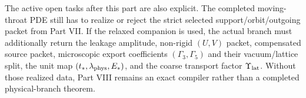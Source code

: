 The active open tasks after this part are also explicit.  The completed moving-throat PDE still has to realize or reject the strict selected support/orbit/outgoing packet from Part VII.  If the relaxed companion is used, the actual branch must additionally return the leakage amplitude, non-rigid \((U,V)\) packet, compensated source packet, microscopic export coefficients \((\Gamma_3,\Gamma_5)\) and their vacuum/lattice split, the unit map \((t_*,\lambda_{\rm phys},E_*)\), and the coarse transport factor \(\Upsilon_{\rm lat}\).  Without those realized data, Part VIII remains an exact compiler rather than a completed physical-branch theorem.
